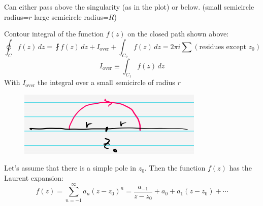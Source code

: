 \documentclass{article}
\begin{document}
\noindent
Can either pass above the singularity (as in the plot) or below. (small semicircle radius=$r$ large semicircle radius=$R$)

\noindent
Contour integral of the function $f(z)$ on the closed path shown above:
\begin{equation}
    \oint_C f(z)\,dz = \fint f(z)\,dz + I_{\text{over}} + \int_{C_2} f(z)\,dz = 2\pi i \sum (\text{residues except } z_0)
\end{equation}
\begin{equation}
    I_{\text{over}} \equiv \int_{C_1} f(z)\,dz
\end{equation}
With $I_{\text{over}}$ the integral over a small semicircle of radius $r$
\begin{figure}[h]
    \centering
    \includegraphics[width=0.35\linewidth]{fig33.png}
\end{figure}

\newpage
\noindent
Let’s assume that there is a simple pole in $z_0$. Then the function $f(z)$ has the Laurent expansion:
\begin{equation}
    f(z) = \sum_{n=-1}^{\infty} a_n (z - z_0)^n = \frac{a_{-1}}{z - z_0} + a_0 + a_1 (z - z_0) + \cdots
\end{equation}
\end{document}
